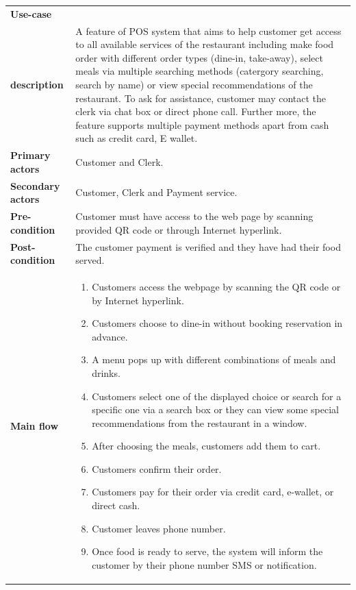 \documentclass[12pt, a4paper]{article}
\theoremstyle{styleth}
\theoremstyle{styledef}
\begin{document}
\begingroup
\renewcommand\arraystretch{1.5}
\begin{longtable}{>{\centering\bfseries\columncolor[HTML]{DAE8FC}{}}m{3.25cm} >{\arraybackslash}m{12cm}}
		\hline
		Use-case \\ description & A feature of POS system that aims to help customer get access to all available services of the restaurant including make food order with different order types (dine-in, take-away), select meals via multiple searching methods (catergory searching, search by name) or view special recommendations of the restaurant. To ask for assistance, customer may contact the clerk via chat box or direct phone call. Further more, the feature supports multiple payment methods apart from cash such as credit card, E wallet. \\
		\hline
		Primary actors & Customer and Clerk. \\
		\hline
		Secondary actors & 
		Customer, Clerk and Payment service. \\
		\hline
		Pre-condition & Customer must have access to the web page by scanning provided QR code or through Internet hyperlink. \\
		\hline
		Post-condition & The customer payment is verified and they have had their food served. \\
		\hline
		Main flow & \begin{enumerate}[leftmargin=*]\setlength\itemsep{-0.1cm}
			\item Customers access the webpage by scanning the QR code or by Internet hyperlink.
			\item Customers choose to dine-in without booking reservation in advance.
			\item A menu pops up with different combinations of meals and drinks.
			\item Customers select one of the displayed choice or search for a specific one via a search box or they can view some special recommendations from the restaurant in a window.
			\item After choosing the meals, customers add them to cart.
			\item Customers confirm their order.
			\item Customers pay for their order via credit card, e-wallet, or direct cash.
			\item Customer leaves phone number.
			\item Once food is ready to serve, the system will inform the customer by their phone number SMS or notification.
		\end{enumerate} \\

\end{longtable}
\end{document}
